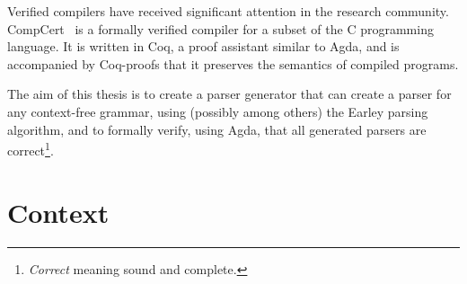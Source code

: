 

	Verified compilers have received significant attention in the research
	community. CompCert~\cite{Leroy} is a formally verified compiler for a
	subset of the C programming language. It is written in Coq, a proof
	assistant similar to Agda, and is accompanied by Coq-proofs that it
	preserves the semantics of compiled programs. 

	The aim of this thesis is to create a parser generator that can create a
	parser for any context-free grammar, using (possibly among others) the
	Earley parsing algorithm, and to formally verify, using Agda, that all
	generated parsers are correct\footnote{\emph{Correct} meaning sound and
	complete.}.

	\section{Context}
